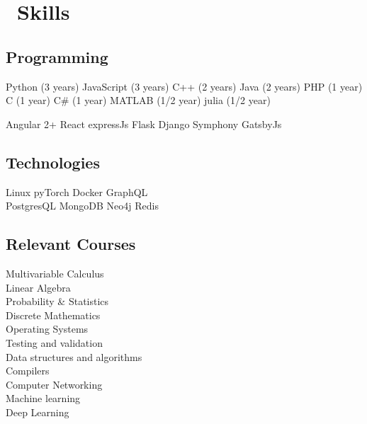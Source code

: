 


\section{\faFire \ Skills}
\subsection{Programming}
Python (3 years) \textbullet{} JavaScript (3 years) \textbullet{} C++ (2 years) \textbullet{} Java (2 years) \textbullet{} PHP (1 year) \textbullet{} C (1 year) \textbullet{} C\# (1 year) \textbullet{} MATLAB (1/2 year) \textbullet{} julia (1/2 year)\\

\sectionsep

Angular 2+ \textbullet{} React \textbullet{} expressJs \textbullet{} Flask \textbullet{} Django \textbullet{} Symphony \textbullet{} GatsbyJs

\sectionsep

\subsection{Technologies}
Linux \textbullet{} pyTorch \textbullet{}  Docker \textbullet{} GraphQL\\
PostgresQL \textbullet{} MongoDB  \textbullet{} Neo4j \textbullet{} Redis\\

\sectionsep

\subsection{Relevant Courses}
Multivariable Calculus\\
Linear Algebra\\
Probability \& Statistics \\
Discrete Mathematics\\
Operating Systems\\ 
Testing and validation\\
Data structures and algorithms\\
Compilers\\
Computer Networking\\
Machine learning\\
Deep Learning\\
